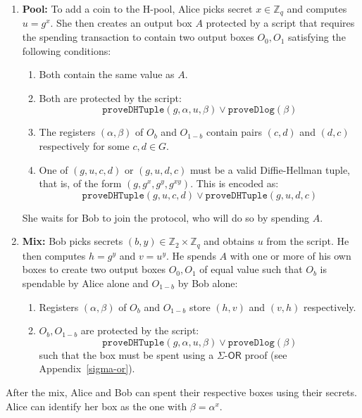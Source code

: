 \documentclass[runningheads]{llncs}
\newcommand{\langname}{ErgoScript\xspace}
\newcommand{\ornode}{\ensuremath{\mathsf{OR}}}
\begin{document}
\begin{enumerate}
	\item \textbf{Pool:} To add a coin to the H-pool, Alice picks secret $x\in \mathbb{Z}_q$ and computes $u = g^x$. She then creates an output box $A$ protected by a script that requires the spending transaction to contain two output boxes $O_0, O_1$ satisfying the following conditions: 
	\begin{enumerate}
		\item Both contain the same value as $A$.
		\item Both are protected by the script: $$\texttt{proveDHTuple}(g, \alpha, u, \beta) \lor \texttt{proveDlog}(\beta)$$
        \item The registers $(\alpha, \beta)$ of $O_b$ and $O_{1-b}$ contain pairs $(c, d)$ and $(d, c)$ respectively for some $c, d\in G$. 
		\item One of $(g, u, c, d)$ or $(g, u, d, c)$ must be a valid Diffie-Hellman tuple, that is, of the form $(g, g^x, g^y, g^{xy})$. This is encoded %
		as: $$\texttt{proveDHTuple}(g, u, c, d)\lor \texttt{proveDHTuple}(g, u, d, c)$$
	\end{enumerate}
	She waits for Bob to join the protocol, who will do so by spending $A$.


	\item \textbf{Mix:} Bob picks secrets $(b, y) \in \mathbb{Z}_2\times \mathbb{Z}_q$ and obtains $u$ from the script. He then computes $h= g^y$ and $v = u^y$. He spends $A$ with one or more of his own boxes to create two output boxes $O_0, O_1$ of equal value such that $O_b$ is spendable by Alice alone and $O_{1-b}$ by Bob alone:
	\begin{enumerate}
		\item Registers $(\alpha, \beta)$ of $O_b$ and $O_{1-b}$ store $(h, v)$ and $(v, h)$ respectively. 
		\item $O_b, O_{1-b}$ are protected by the script: $$\texttt{proveDHTuple}(g, \alpha, u, \beta)\lor \texttt{proveDlog}(\beta)$$
		such that the box must be spent using a $\Sigma$-$\ornode$ proof (see Appendix~\ref{sigma-or}).
	\end{enumerate}
\end{enumerate}
After the mix, Alice and Bob can spent their respective boxes using their secrets. 
Alice can identify her box as the one with $\beta = \alpha^x$. 
\end{document}
